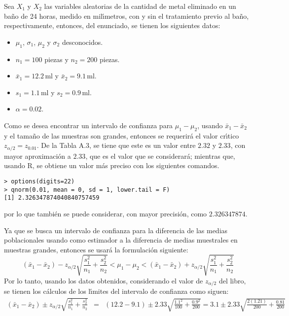 \begin{solucion}
 Sea $X_1$ y $X_2$ las variables aleatorias de la cantidad de metal eliminado en un baño de 24 horas, medido en mil\'{\i}metros, con y sin el tratamiento previo al baño, respectivamente, entonces, del enunciado, se tienen los siguientes datos:
 \begin{itemize}
  \item $\mu_1$, $\sigma_1$, $\mu_2$ y $\sigma_2$ desconocidos.
  \item $n_1 = 100$ piezas y $n_2 = 200$ piezas.
  \item $\bar{x}_1 = 12.2\,$ml y $\bar{x}_2 = 9.1\,$ml.
  \item $s_1 = 1.1\,$ml y $s_2 = 0.9\,$ml.
  \item $\alpha = 0.02$.
 \end{itemize}
 Como se desea encontrar un intervalo de confianza para $\mu_1-\mu_2$, usando $\bar{x}_1-\bar{x}_2$ y el tama\~no de las muestras son grandes, entonces se requerir\'a el valor cr\'{\i}tico $z_{\alpha/2} = z_{0.01}$. De la Tabla A.3, se tiene que este es un valor entre $2.32$ y $2.33$, con mayor aproximaci\'on a $2.33$, que es el valor que se considerar\'a; mientras que, usando R, se obtiene un valor m\'as preciso con los siguientes comandos.
 \begin{verbatim}
> options(digits=22)
> qnorm(0.01, mean = 0, sd = 1, lower.tail = F)
[1] 2.326347874040840757459
 \end{verbatim}
 \vspace{-0.5cm}
 por lo que tambi\'en se puede considerar, con mayor precisi\'on, como $2.326347874$.
 \par 
 Ya que se busca un intervalo de confianza para la diferencia de las medias poblacionales usando como estimador a la diferencia de medias muestrales en muestras grandes, entonces se usar\'a la formulaci\'on siguiente:
 \begin{equation*}
  \left( \bar{x}_1 - \bar{x}_2 \right) - z_{\alpha/2}\sqrt{\frac{s_1^2}{n_1} + \frac{s_2^2}{n_2}} < \mu_1 - \mu_2 < \left( \bar{x}_1 - \bar{x}_2 \right) + z_{\alpha/2}\sqrt{\frac{s_1^2}{n_1} + \frac{s_2^2}{n_2}}
 \end{equation*}
 Por lo tanto, usando los datos obtenidos, considerando el valor de $z_{\alpha/2}$ del libro, se tienen los c\'alculos de los l\'{\i}mites del intervalo de confianza como siguen:
 \begin{eqnarray*}
  \left( \bar{x}_1 - \bar{x}_2 \right) \pm z_{\alpha/2}\sqrt{\frac{s_1^2}{n_1} + \frac{s_2^2}{n_2}} & = & (12.2 - 9.1) \pm 2.33\sqrt{\frac{1.1^2}{100} + \frac{0.9^2}{200}} = 3.1 \pm 2.33\sqrt{\frac{2(1.21)}{200} + \frac{0.81}{200}} \\

\end{eqnarray*}
\end{solucion}
